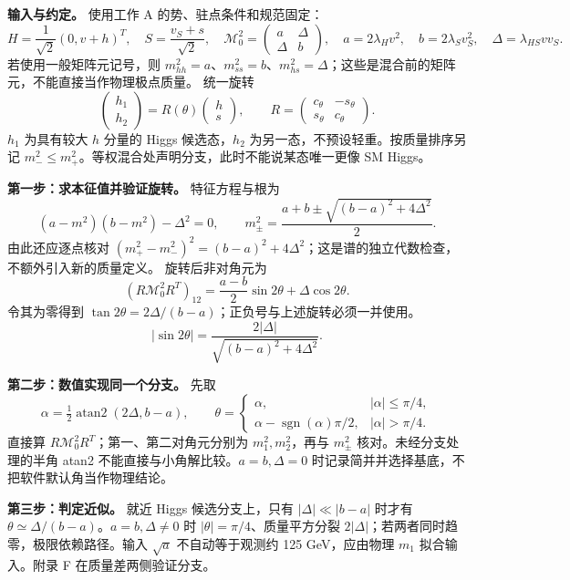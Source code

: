\documentclass[
]{article}
\begin{document}
\textbf{输入与约定。} 使用工作 A 的势、驻点条件和规范固定： \[
H=\frac1{\sqrt2}(0,v+h)^T,\quad S=\frac{v_S+s}{\sqrt2},\quad
\mathcal M_0^2=\begin{pmatrix}a&\Delta\\\Delta&b\end{pmatrix},
\quad a=2\lambda_Hv^2,\quad b=2\lambda_Sv_S^2,\quad\Delta=\lambda_{HS}vv_S.
\] 若使用一般矩阵元记号，则
\(m_{hh}^2=a\)、\(m_{ss}^2=b\)、\(m_{hs}^2=\Delta\)；这些是混合前的矩阵元，不能直接当作物理极点质量。
统一旋转 \[
\begin{pmatrix}h_1\\h_2\end{pmatrix}
=R(\theta)\begin{pmatrix}h\\s\end{pmatrix},\qquad
R=\begin{pmatrix}c_\theta&-s_\theta\\s_\theta&c_\theta\end{pmatrix}.
\] \(h_1\) 为具有较大 \(h\) 分量的 Higgs 候选态，\(h_2\)
为另一态，不预设轻重。按质量排序另记
\(m_-^2\le m_+^2\)。等权混合处声明分支，此时不能说某态唯一更像 SM
Higgs。

\textbf{第一步：求本征值并验证旋转。} 特征方程与根为 \[
(a-m^2)(b-m^2)-\Delta^2=0,\qquad
m_\pm^2=\frac{a+b\pm\sqrt{(b-a)^2+4\Delta^2}}2.
\] 由此还应逐点核对
\((m_+^2-m_-^2)^2=(b-a)^2+4\Delta^2\)；这是谱的独立代数检查，不额外引入新的质量定义。
旋转后非对角元为 \[
(R\mathcal M_0^2R^T)_{12}=\frac{a-b}{2}\sin2\theta+\Delta\cos2\theta.
\] 令其为零得到
\(\tan2\theta=2\Delta/(b-a)\)；正负号与上述旋转必须一并使用。 \[
\lvert\sin2\theta\rvert=\frac{2\lvert\Delta\rvert}{\sqrt{(b-a)^2+4\Delta^2}}.
\]

\textbf{第二步：数值实现同一个分支。} 先取 \[
\alpha=\tfrac12\operatorname{atan2}(2\Delta,b-a),\qquad
\theta=\begin{cases}\alpha,&\lvert\alpha\rvert\le\pi/4,\\
\alpha-\operatorname{sgn}(\alpha)\pi/2,&\lvert\alpha\rvert>\pi/4.\end{cases}
\] 直接算 \(R\mathcal M_0^2R^T\)；第一、第二对角元分别为
\(m_1^2,m_2^2\)，再与 \(m_\pm^2\) 核对。未经分支处理的半角 atan2
不能直接与小角解比较。\(a=b,\Delta=0\)
时记录简并并选择基底，不把软件默认角当作物理结论。

\textbf{第三步：判定近似。} 就近 Higgs 候选分支上，只有
\(\lvert\Delta\rvert\ll\lvert b-a\rvert\) 时才有
\(\theta\simeq\Delta/(b-a)\)。\(a=b,\Delta\ne0\) 时
\(\lvert\theta\rvert=\pi/4\)、质量平方分裂
\(2\lvert\Delta\rvert\)；若两者同时趋零，极限依赖路径。输入 \(\sqrt a\)
不自动等于观测约 125 GeV，应由物理 \(m_1\) 拟合输入。附录 F
在质量差两侧验证分支。
\end{document}
